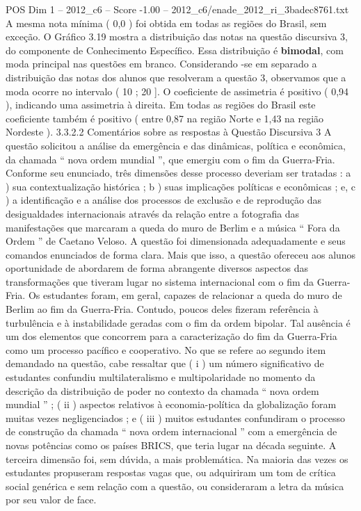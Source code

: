 \begin{textsample}{POS Dim 1 – 2012\_c6 – Score -1.00 – 2012\_c6/enade\_2012\_ri\_3badec8761.txt}
A mesma nota mínima ( 0,0 ) foi obtida em todas as regiões do Brasil, sem exceção.
O Gráfico 3.19 mostra a distribuição das notas na questão discursiva 3, do componente de Conhecimento Específico.
Essa distribuição é \textbf{bimodal}, com moda principal nas questões em branco.
Considerando -se em separado a distribuição das notas dos alunos que resolveram a questão 3, observamos que a moda ocorre no intervalo ( 10 ; 20 ].
O coeficiente de assimetria é positivo ( 0,94 ), indicando uma assimetria à direita.
Em todas as regiões do Brasil este coeficiente também é positivo ( entre 0,87 na região Norte e 1,43 na região Nordeste ). 3.3.2.2 Comentários sobre as respostas à Questão Discursiva 3 A questão solicitou a análise da emergência e das dinâmicas, política e econômica, da chamada “ nova ordem mundial ”, que emergiu com o fim da Guerra-Fria.
Conforme seu enunciado, três dimensões desse processo deveriam ser tratadas : a ) sua contextualização histórica ; b ) suas implicações políticas e econômicas ; e, c ) a identificação e a análise dos processos de exclusão e de reprodução das desigualdades internacionais através da relação entre a fotografia das manifestações que marcaram a queda do muro de Berlim e a música “ Fora da Ordem ” de Caetano Veloso.
A questão foi dimensionada adequadamente e seus comandos enunciados de forma clara.
Mais que isso, a questão ofereceu aos alunos oportunidade de abordarem de forma abrangente diversos aspectos das transformações que tiveram lugar no sistema internacional com o fim da Guerra-Fria.
Os estudantes foram, em geral, capazes de relacionar a queda do muro de Berlim ao fim da Guerra-Fria.
Contudo, poucos deles fizeram referência à turbulência e à instabilidade geradas com o fim da ordem bipolar.
Tal ausência é um dos elementos que concorrem para a caracterização do fim da Guerra-Fria como um processo pacífico e cooperativo.
No que se refere ao segundo item demandado na questão, cabe ressaltar que ( i ) um número significativo de estudantes confundiu multilateralismo e multipolaridade no momento da descrição da distribuição de poder no contexto da chamada “ nova ordem mundial ” ; ( ii ) aspectos relativos à economia-política da globalização foram muitas vezes negligenciados ; e ( iii ) muitos estudantes confundiram o processo de construção da chamada “ nova ordem internacional ” com a emergência de novas potências como os países BRICS, que teria lugar na década seguinte.
A terceira dimensão foi, sem dúvida, a mais problemática.
Na maioria das vezes os estudantes propuseram respostas vagas que, ou adquiriram um tom de crítica social genérica e sem relação com a questão, ou consideraram a letra da música por seu valor de face.

\end{textsample}

